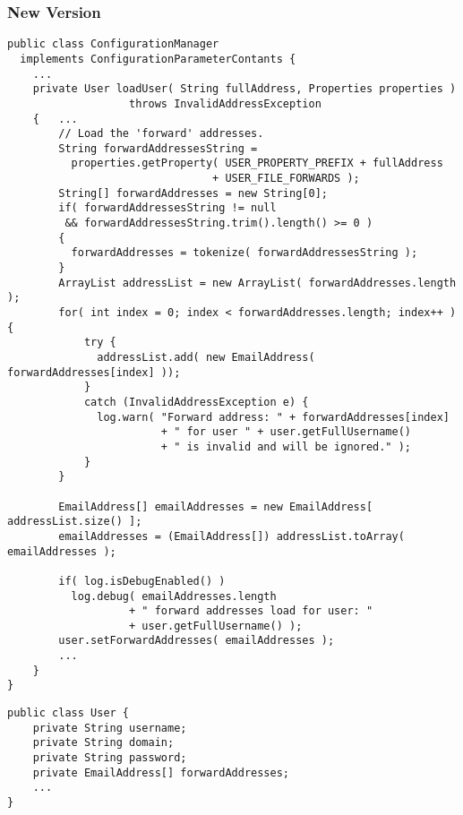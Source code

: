 \subsubsection{New Version}

\begin{lstlisting}
public class ConfigurationManager
  implements ConfigurationParameterContants {
    ...
    private User loadUser( String fullAddress, Properties properties )
                   throws InvalidAddressException
    {   ...
        // Load the 'forward' addresses.
        String forwardAddressesString =
          properties.getProperty( USER_PROPERTY_PREFIX + fullAddress 
                                + USER_FILE_FORWARDS );
        String[] forwardAddresses = new String[0];
        if( forwardAddressesString != null 
         && forwardAddressesString.trim().length() >= 0 )
        {
          forwardAddresses = tokenize( forwardAddressesString );
        }
        ArrayList addressList = new ArrayList( forwardAddresses.length );
        for( int index = 0; index < forwardAddresses.length; index++ ) {
            try {
              addressList.add( new EmailAddress( forwardAddresses[index] ));
            }
            catch (InvalidAddressException e) {
              log.warn( "Forward address: " + forwardAddresses[index]
                        + " for user " + user.getFullUsername()
                        + " is invalid and will be ignored." );
            }
        }

        EmailAddress[] emailAddresses = new EmailAddress[ addressList.size() ];
        emailAddresses = (EmailAddress[]) addressList.toArray( emailAddresses );

        if( log.isDebugEnabled() ) 
          log.debug( emailAddresses.length
                   + " forward addresses load for user: "
                   + user.getFullUsername() );
        user.setForwardAddresses( emailAddresses );
        ...
    }
}
\end{lstlisting}

\begin{lstlisting}
public class User {
    private String username;
    private String domain;
    private String password;
    private EmailAddress[] forwardAddresses;
    ...
}
\end{lstlisting}


